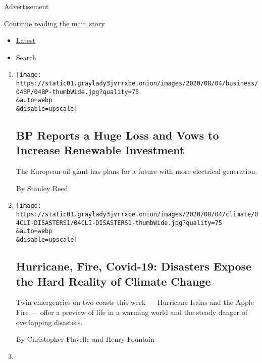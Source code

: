 Advertisement

\protect\hyperlink{after-mid1}{Continue reading the main story}

\begin{itemize}
\tightlist
\item
  \protect\hyperlink{stream-panel}{Latest}
\item
  Search
\end{itemize}

\begin{enumerate}
\def\labelenumi{\arabic{enumi}.}
\item
  \href{/2020/08/04/business/energy-environment/bp-renewable-investment.html}{}

  \texttt{[image: https://static01.graylady3jvrrxbe.onion/images/2020/08/04/business/04BP/04BP-thumbWide.jpg?quality=75\\\&auto=webp\\\&disable=upscale]}

  \hypertarget{bp-reports-a-huge-loss-and-vows-to-increase-renewable-investment}{%
  \subsection{BP Reports a Huge Loss and Vows to Increase Renewable
  Investment}\label{bp-reports-a-huge-loss-and-vows-to-increase-renewable-investment}}

  The European oil giant has plans for a future with more electrical
  generation.

  By Stanley Reed
\item
  \href{/2020/08/04/climate/hurricane-isaias-apple-fire-climate.html}{}

  \texttt{[image: https://static01.graylady3jvrrxbe.onion/images/2020/08/04/climate/04CLI-DISASTERS1/04CLI-DISASTERS1-thumbWide.jpg?quality=75\\\&auto=webp\\\&disable=upscale]}

  \hypertarget{hurricane-fire-covid-19-disasters-expose-the-hard-reality-of-climate-change}{%
  \subsection{Hurricane, Fire, Covid-19: Disasters Expose the Hard
  Reality of Climate
  Change}\label{hurricane-fire-covid-19-disasters-expose-the-hard-reality-of-climate-change}}

  Twin emergencies on two coasts this week --- Hurricane Isaias and the
  Apple Fire --- offer a preview of life in a warming world and the
  steady danger of overlapping disasters.

  By Christopher Flavelle and Henry Fountain
\item
  \href{/2020/08/04/books/review/migrations-charlotte-mcconaghy.html}{}


\end{enumerate}

